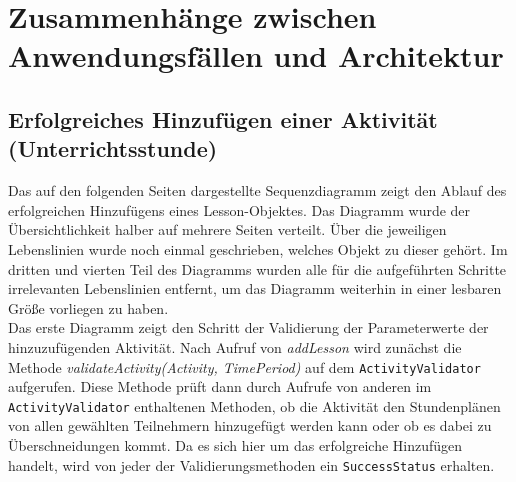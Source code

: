 \documentclass[fontsize=12pt,paper=a4,twoside]{scrartcl}
\begin{document}
\section[Zusammenhänge zwischen Anwendungsfällen und Architektur]{Zusammenhänge zwischen Anwendungsfällen und Architektur}
\label{sec:anwendungsfaelle}

\subsection{Erfolgreiches Hinzufügen einer Aktivität (Unterrichtsstunde)}
\label{subsec:addActivitySuccess}
Das auf den folgenden Seiten dargestellte Sequenzdiagramm zeigt den Ablauf des erfolgreichen Hinzufügens eines Lesson-Objektes. Das Diagramm wurde der Übersichtlichkeit halber auf mehrere Seiten verteilt. Über die jeweiligen Lebenslinien wurde noch einmal geschrieben, welches Objekt zu dieser gehört. Im dritten und vierten Teil des Diagramms wurden alle für die aufgeführten Schritte irrelevanten Lebenslinien entfernt, um das Diagramm weiterhin in einer lesbaren Größe vorliegen zu haben. \\

Das erste Diagramm zeigt den Schritt der Validierung der Parameterwerte der hinzuzufügenden Aktivität. Nach Aufruf von \textit{addLesson} wird zunächst die Methode \textit{validateActivity(Activity, TimePeriod)} auf dem \texttt{ActivityValidator} aufgerufen. Diese Methode prüft dann durch Aufrufe von anderen im \texttt{ActivityValidator} enthaltenen Methoden, ob die Aktivität den Stundenplänen von allen gewählten Teilnehmern hinzugefügt werden kann oder ob es dabei zu Überschneidungen kommt. Da es sich hier um das erfolgreiche Hinzufügen handelt, wird von jeder der Validierungsmethoden ein \texttt{SuccessStatus} erhalten. \\
\end{document}
